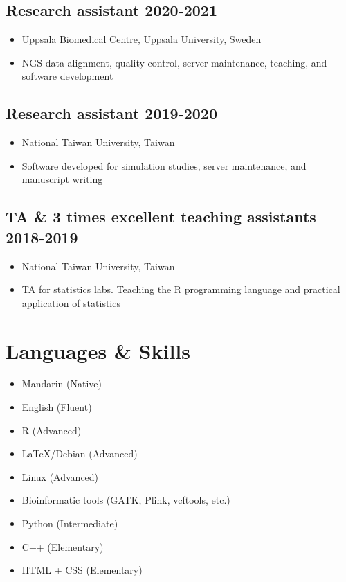 \documentclass[10pt]{article}
\begin{document}
\subsection*{Research assistant \hfill 2020-2021}
\begin{itemize}
\item Uppsala Biomedical Centre, Uppsala University, Sweden
\item NGS data alignment, quality control, server maintenance, teaching, and software development
\end{itemize}

\subsection*{Research assistant \hfill 2019-2020}
\begin{itemize}
\item National Taiwan University, Taiwan
\item Software developed for simulation studies, server maintenance, and manuscript writing
\end{itemize}

\subsection*{TA \& 3 times excellent teaching assistants \hfill 2018-2019}
\begin{itemize}
\item National Taiwan University, Taiwan
\item TA for statistics labs. Teaching the R programming language and practical application of statistics
\end{itemize}



\section*{Languages \& Skills}
\begin{multicols}{2}
\begin{itemize}
\item Mandarin (Native)
\item English (Fluent)
\item R (Advanced)
\item LaTeX/Debian (Advanced)
\item Linux (Advanced)
\item Bioinformatic tools (GATK, Plink, vcftools, etc.)
\item Python (Intermediate)
\item C++ (Elementary)
\item HTML + CSS (Elementary)
\end{itemize}
\end{multicols}
\end{document}
